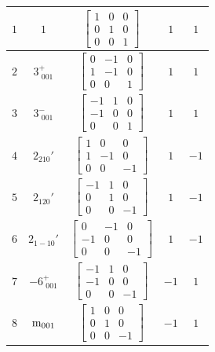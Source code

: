 \documentclass[fleqn,8pt]{jsarticle}
\begin{document}
\begin{longtable}{ccccc}
$ 1 $ & $ 1 $ & $ \begin{bmatrix} 1 & 0 & 0 \\ 0 & 1 & 0 \\ 0 & 0 & 1 \end{bmatrix} $ & $ 1 $ & $ 1 $ \\ \hline
$ 2 $ & $ 3^{+}_{\,\,001} $ & $ \begin{bmatrix} 0 & -1 & 0 \\ 1 & -1 & 0 \\ 0 & 0 & 1 \end{bmatrix} $ & $ 1 $ & $ 1 $ \\ \hline
$ 3 $ & $ 3^{-}_{\,\,001} $ & $ \begin{bmatrix} -1 & 1 & 0 \\ -1 & 0 & 0 \\ 0 & 0 & 1 \end{bmatrix} $ & $ 1 $ & $ 1 $ \\ \hline
$ 4 $ & $ 2{}_{210}{}' $ & $ \begin{bmatrix} 1 & 0 & 0 \\ 1 & -1 & 0 \\ 0 & 0 & -1 \end{bmatrix} $ & $ 1 $ & $ -1 $ \\ \hline
$ 5 $ & $ 2{}_{120}{}' $ & $ \begin{bmatrix} -1 & 1 & 0 \\ 0 & 1 & 0 \\ 0 & 0 & -1 \end{bmatrix} $ & $ 1 $ & $ -1 $ \\ \hline
$ 6 $ & $ 2{}_{1-10}{}' $ & $ \begin{bmatrix} 0 & -1 & 0 \\ -1 & 0 & 0 \\ 0 & 0 & -1 \end{bmatrix} $ & $ 1 $ & $ -1 $ \\ \hline
$ 7 $ & $ -6^{+}_{\,\,001} $ & $ \begin{bmatrix} -1 & 1 & 0 \\ -1 & 0 & 0 \\ 0 & 0 & -1 \end{bmatrix} $ & $ -1 $ & $ 1 $ \\ \hline
$ 8 $ & $ {\rm m}_{001} $ & $ \begin{bmatrix} 1 & 0 & 0 \\ 0 & 1 & 0 \\ 0 & 0 & -1 \end{bmatrix} $ & $ -1 $ & $ 1 $ \\ \hline

\end{longtable}
\end{document}
